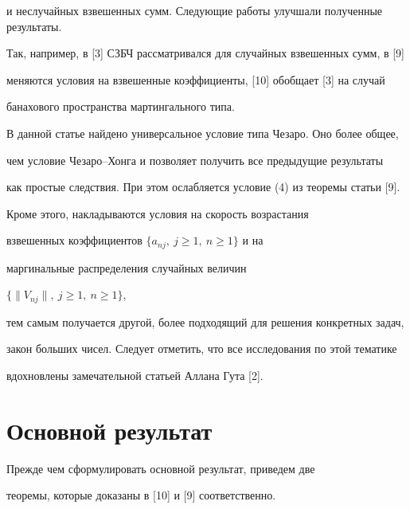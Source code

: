 и неслучайных взвешенных сумм. Следующие работы улучшали полученные результаты.


Так, например, в [3] СЗБЧ рассматривался для случайных взвешенных сумм, в [9]


меняются условия на взвешенные коэффициенты, [10] обобщает [3] на случай


банахового пространства мартингального типа.





В данной статье найдено универсальное условие типа Чезаро. Оно более общее,


чем условие Чезаро--Хонга и позволяет получить все предыдущие результаты


как простые следствия. При этом ослабляется условие (4) из теоремы статьи [9].


Кроме этого, накладываются условия на скорость возрастания


взвешенных коэффициентов $\{a_{nj},\ j \geq 1,\ n \geq 1\}$ и на 


маргинальные распределения случайных величин


$\{\|V_{nj}\|,\ j \geq 1,\ n \geq 1\}$,


тем самым получается другой, более подходящий для решения конкретных задач,


закон больших чисел. Следует отметить, что все исследования по этой тематике


вдохновлены замечательной статьей Аллана Гута [2].





\section*{Основной результат}





Прежде чем сформулировать основной результат, приведем две


теоремы, которые доказаны в [10] и [9] соответственно.





